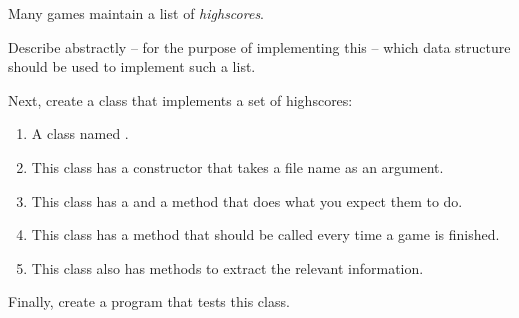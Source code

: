 Many games maintain a list of \textsl{highscores}.

Describe abstractly -- for the purpose of implementing this -- which data structure should be used to implement such a list.

Next, create a class that implements a set of highscores:
\begin{enumerate}
  \item A class named .
  \item This class has a constructor that takes a file name as an argument.
  \item This class has a  and a  method that does what you expect them to do.
  \item This class has a  method that should be called every time a game is finished.
  \item This class also has methods to extract the relevant information.
\end{enumerate}

Finally, create a program that tests this class.
